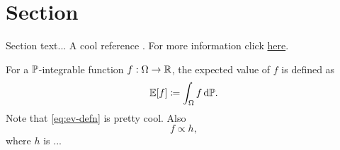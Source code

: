 \section{Section}
Section text... A cool reference \citet{hastie2009elements}. For more information click \href{https://tex.stackexchange.com/questions/98528/further-customize-color-of-hyperref-links}{here}.

For a $\P$-integrable function $f:\Omega\to\R$, the expected value of $f$ is defined as
\begin{equation}\label{eq:ev-defn}
    \E[f] \coloneqq \int_{\Omega}f\,\mathrm{d}\P.
\end{equation}
Note that \eqref{eq:ev-defn} is pretty cool. Also
\begin{equation*}
    f \propto h,
\end{equation*}
where $h$ is ...